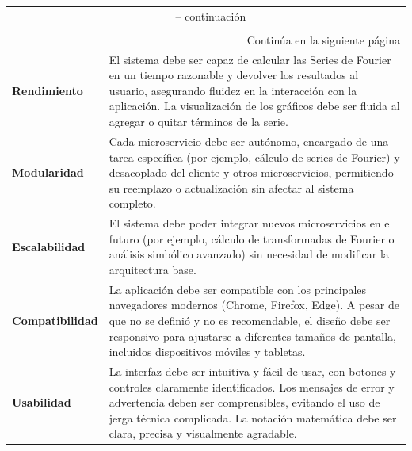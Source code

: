 \begin{longtable}{|m{5cm}|m{8.5cm}|}
	\hline
	\rowcolor{black!75}
	\head {Nombre} & \head {Descripción} \\ \hline
	\endfirsthead
	\multicolumn{2}{c}{{\tablename\ \thetable{} -- continuación}} \\
	\rowcolor{black!75}
	\head {Nombre} & \head {Descripción}\\ \hline
	\endhead
	\hline \multicolumn{2}{r}{{Continúa en la siguiente página}} \\
	\endfoot
	\hline
	\endlastfoot
	
	\textbf{Rendimiento} & El sistema debe ser capaz de calcular las Series de Fourier en un tiempo razonable  y devolver los resultados al usuario, asegurando fluidez en la interacción con la aplicación. La visualización de los gráficos debe ser fluida al agregar o quitar términos de la serie. \\ 
	\hline
	
	\textbf{Modularidad} & Cada microservicio debe ser autónomo, encargado de una tarea específica (por ejemplo, cálculo de series de Fourier) y desacoplado del cliente y otros microservicios, permitiendo su reemplazo o actualización sin afectar al sistema completo. \\
	\hline
		
	\textbf{Escalabilidad} & El sistema debe poder integrar nuevos microservicios en el futuro (por ejemplo, cálculo de transformadas de Fourier o análisis simbólico avanzado) sin necesidad de modificar la arquitectura base. \\ 
	\hline
	
	\textbf{Compatibilidad}  & La aplicación debe ser compatible con los principales navegadores modernos (Chrome, Firefox, Edge). A pesar de que no se definió y no es recomendable, el diseño debe ser responsivo para ajustarse a diferentes tamaños de pantalla, incluidos dispositivos móviles y tabletas. \\ \hline
	
	\textbf{Usabilidad} & La interfaz debe ser intuitiva y fácil de usar, con botones y controles claramente identificados. Los mensajes de error y advertencia deben ser comprensibles, evitando el uso de jerga técnica complicada. La notación matemática debe ser clara, precisa y visualmente agradable. \\
	\hline
	
	

\end{longtable}
